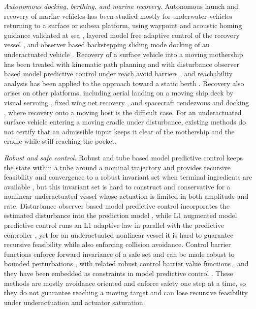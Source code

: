 \documentclass[5p,times,authoryear]{elsarticle}
\begin{document}
\textit{Autonomous docking, berthing, and marine recovery.} Autonomous launch and recovery of marine vehicles has been studied mostly for underwater vehicles returning to a surface or subsea platform, using waypoint and acoustic homing guidance validated at sea \citep{sarda2019launch}, layered model free adaptive control of the recovery vessel \citep{liao2023disturbance}, and observer based backstepping sliding mode docking of an underactuated vehicle \citep{xie2022threedimensional, yazdani2020underwaterdocking, zhang2023uuvrecovery}. Recovery of a surface vehicle into a moving mothership has been treated with kinematic path planning \citep{xu2023multistage} and with disturbance observer based model predictive control under reach avoid barriers \citep{park2026recovery}, and reachability analysis has been applied to the approach toward a static berth \citep{park2020reachability}. Recovery also arises on other platforms, including aerial landing on a moving ship deck by visual servoing \citep{cho2022shipdeck}, fixed wing net recovery \citep{singh2024sdre}, and spacecraft rendezvous and docking \citep{luo2014rendezvous}, where recovery onto a moving host is the difficult case. For an underactuated surface vehicle entering a moving cradle under disturbance, existing methods do not certify that an admissible input keeps it clear of the mothership and the cradle while still reaching the pocket.

\textit{Robust and safe control.} Robust and tube based model predictive control keeps the state within a tube around a nominal trajectory and provides recursive feasibility and convergence to a robust invariant set when terminal ingredients are available \citep{langson2004tube, mayne2005robust}, but this invariant set is hard to construct and conservative for a nonlinear underactuated vessel whose actuation is limited in both amplitude and rate. Disturbance observer based model predictive control incorporates the estimated disturbance into the prediction model \citep{tomera2021dob}, while L1 augmented model predictive control runs an L1 adaptive law in parallel with the predictive controller \citep{hovakimyan2010l1}, yet for an underactuated nonlinear vessel it is hard to guarantee recursive feasibility while also enforcing collision avoidance. Control barrier functions enforce forward invariance of a safe set and can be made robust to bounded perturbations \citep{xu2015robustness}, with related robust control barrier value functions \citep{choi2021robust}, and they have been embedded as constraints in model predictive control \citep{zeng2021safety, zeng2021enhancing, wang2025safety}. These methods are mostly avoidance oriented and enforce safety one step at a time, so they do not guarantee reaching a moving target and can lose recursive feasibility under underactuation and actuator saturation.
\end{document}
